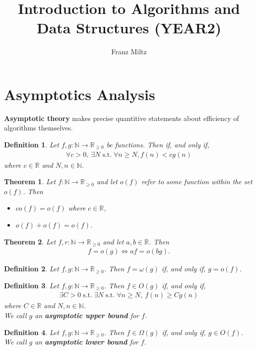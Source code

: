 \documentclass{article}
\DeclareMathOperator{\st}{s.t.}
\theoremstyle{sltheorem}
\newtheorem{definition}{Definition}[section]
\newtheorem{theorem}{Theorem}[section]
\newcommand{\R}{\mathbb{R}}
\newcommand{\N}{\mathbb{N}}
\newcommand*\B[1]{\textbf{#1}}
\begin{document}
\title{Introduction to Algorithms and Data Structures (YEAR2)}
\author{Franz Miltz}
\maketitle
\tableofcontents  
\section{Asymptotics Analysis}
\B{Asymptotic theory} makes precise quantitive statements about efficiency of algorithms themselves.
\begin{definition}
	Let $f,g:\N\to\R_{\geq 0}$ be functions. Then
	 if, and only if, 
	\begin{align*}
		\forall c>0,\:\exists N\st \forall n \geq N, f(n)<cg(n)
	\end{align*}
	where $c\in\R$ and $N,n\in\N$.
\end{definition}
\begin{theorem}
	Let $f:\N\to\R_{\geq 0}$ and let $o(f)$ refer to some
	function within the set $o(f)$. Then
	\begin{itemize}
		\item $co(f)=o(f)$ where $c\in\R$,
		\item $o(f) + o(f) = o(f)$.
	\end{itemize}
\end{theorem}
\begin{theorem}
	Let $f,r:\N\to\R_{\geq 0}$ and let $a,b\in\R$. Then
	\begin{align*}
		f=o(g) \Leftrightarrow af=o(bg).	
	\end{align*}
\end{theorem}
\begin{definition}
	Let $f,g:\N\to\R_{\geq 0}$. Then $f=\omega(g)$ if, and only if, $g=o(f)$.
\end{definition}
\begin{definition}
	Let $f,g:\N\to\R_{\geq 0}$. Then $f\in O(g)$ if, and only if,
	\begin{align*}
		\exists C > 0\st \exists N \st \forall n \geq N,\: f(n) \geq Cg(n)
	\end{align*}
	where $C\in\R$ and $N,n\in\N$.\\
	We call $g$ an \B{asymptotic upper bound} for $f$.
\end{definition}
\begin{definition}
	Let $f,g:\N\to\R_{\geq 0}$. Then $f\in\Omega(g)$ if, and only if, $g\in O(f)$.\\
	We call $g$ an \B{asymptotic lower bound} for $f$.
\end{definition}
\end{document}
